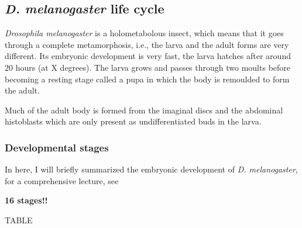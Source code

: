 \subsection{\textit{D. melanogaster} life cycle}

\textit{Drosophila melanogaster} is a holometabolous insect, which means that it goes through a complete metamorphosis, i.e., the larva and the adult forms are very different.
Its embryonic development is very fast, the larva hatches after around 20 hours (at  X degrees).
The larva grows and passes through two moults before becoming a resting stage called a pupa in which
the body is remoulded to form the adult. 

Much of the adult body is formed
from the imaginal discs and the abdominal histoblasts which are only present
as undifferentiated buds in the larva.

\subsubsection{Developmental stages}

In here, I will briefly summarized the embryonic development of \textit{D. melanogaster}, for a comprehensive lecture, see \citep{Campos-Ortega1985,Gilbert2014}

\textbf{16 stages!! }
%

TABLE



